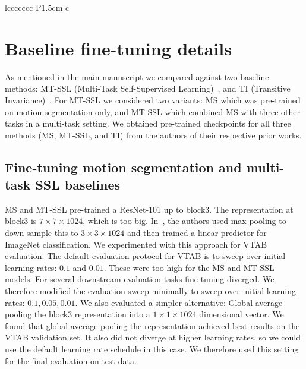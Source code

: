 \documentclass[10pt,twocolumn,letterpaper]{article}
\begin{document}
\begin{table}
{\begin{tabular}{lccccccc P{1.5cm} c}
\bottomrule
\end{tabular}     }
    \caption{Learning rate (LR), number of training iterations (\#it.), number of linear warm-up iterations (w. \#it.), learning rate schedule (LR schedule), weight decay (WD), video-level loss weight ($\lambda$), supervised cross-entropy loss weight ($\gamma$), batch size, and the number of exemplars (\#exemp.) for the different models considered in this paper. Lists of values indicate values explored in the parameter sweep, with the optimal value (in terms of validation VTAB 1000 example score) underlined. For the co-training methods we indicate video (suffix ``sh.'') and image (suffix ``im.'') batch size. If the number of exemplars is followed by ``(sh.)'' we use consecutive frames of the same shot to create exemplars.}
    \label{tab:train-details}
\end{table}

\section{Baseline fine-tuning details}

As mentioned in the main manuscript we compared against two baseline methods: MT-SSL (Multi-Task Self-Supervised Learning)~\cite{doersch2017multi}, and TI (Transitive Invariance)~\cite{wang2017transitive}. For MT-SSL we considered two variants: MS which was pre-trained on motion segmentation only, and MT-SSL which combined MS with three other tasks in a multi-task setting. We obtained pre-trained checkpoints for all three methods (MS, MT-SSL, and TI) from the authors of their respective prior works.

\subsection{Fine-tuning motion segmentation and multi-task SSL baselines}
MS and MT-SSL pre-trained a ResNet-101 up to block3. The representation at block3 is $7 \times 7 \times 1024$, which is too big. In~\cite{doersch2017multi}, the authors used max-pooling to down-sample this to $3 \times 3 \times 1024$ and then trained a linear predictor for ImageNet classification. We experimented with this approach for VTAB evaluation. The default evaluation protocol for VTAB is to sweep over initial learning rates: $0.1$ and $0.01$. These were too high for the MS and MT-SSL models. For several downstream evaluation tasks fine-tuning diverged. We therefore modified the evaluation sweep minimally to sweep over initial learning rates: $0.1, 0.05, 0.01$. We also evaluated a simpler alternative: Global average pooling the block3 representation into a $1 \times 1 \times 1024$ dimensional vector. We found that global average pooling the representation achieved best results on the VTAB validation set. It also did not diverge at higher learning rates,  so we could use the default learning rate schedule in this case. We therefore used this setting for the final evaluation on test data.
\end{document}
